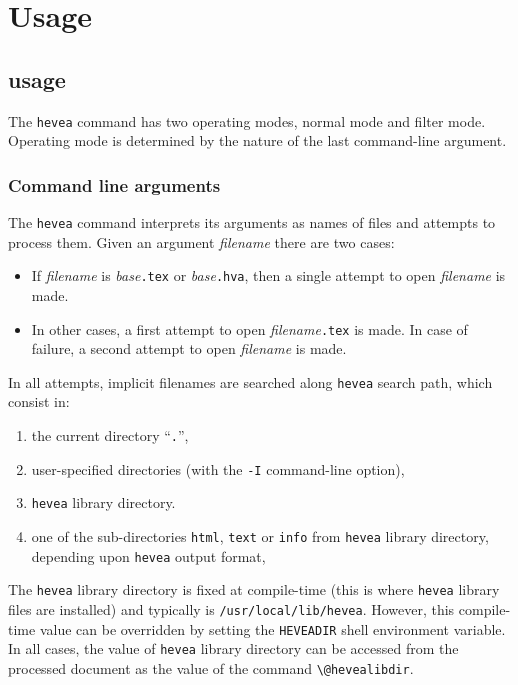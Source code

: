 \section{Usage}
\subsection{\hevea{} usage}\label{heveausage}
The \texttt{hevea} command has two operating modes, normal mode and
filter mode.
Operating mode is determined by the nature of the last command-line
argument.

\subsubsection{Command line arguments}\label{comline}
The \texttt{hevea} command interprets its arguments as names of
files and attempts to process them.
Given an argument \textit{filename} there are two cases:
\begin{itemize}
\item If \textit{filename} is \textit{base}\texttt{.tex} or
\textit{base}\texttt{.hva},
then a single attempt to open \textit{filename} is made.
\item In other cases,
a first attempt to open \textit{filename}\texttt{.tex} is made.
In case of failure, a second attempt to open  \textit{filename} is made.
\end{itemize}
\label{search:path}
In all attempts, implicit filenames are
searched along \texttt{hevea} search path, which consist in:
\begin{enumerate}
\item the current directory ``\texttt{.}'',
\item user-specified directories (with the \texttt{-I} command-line
option),
\item \texttt{hevea} library directory.
\item one of the sub-directories \texttt{html}, \texttt{text} or
\texttt{info} from \texttt{hevea} library directory, depending upon
\texttt{hevea} output format,
\end{enumerate}
The \texttt{hevea} library directory is fixed at compile-time
(this is where \texttt{hevea} library files are installed)
and typically is \texttt{/usr/local/lib/hevea}.
However, this compile-time value can be overridden
by setting the \texttt{HEVEADIR} shell environment variable.
In all cases, the value of \texttt{hevea} library directory can
be accessed from the processed document as the value of the command
\verb+\@hevealibdir+.



